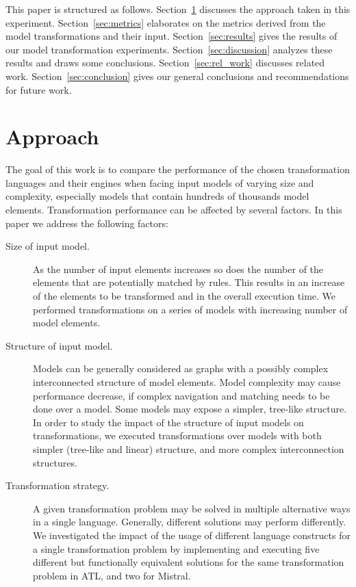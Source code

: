 \documentclass[12pt]{elsarticle}
\begin{document}
This paper is structured as follows. Section~\ref{sec:approach} discusses the
approach taken in this experiment. Section~\ref{sec:metrics} elaborates on
the metrics derived from the model transformations and their input.
Section~\ref{sec:results} gives the results of our model transformation
experiments. Section~\ref{sec:discussion} analyzes these results and draws some conclusions.
Section~\ref{sec:rel_work} discusses related work. Section~\ref{sec:conclusion}
gives our general conclusions and recommendations for future work.

\section{Approach}\label{sec:approach}

The goal of this work is to compare the performance of the chosen transformation
languages and their engines when facing input models of varying size and complexity,
especially models that contain hundreds of thousands model elements.
Transformation performance can be affected by several factors. In this paper we
address the following factors:

\begin{description}
\item[Size of input model.] As the number of input elements increases so does
the number of the elements that are potentially matched by rules. This results
in an increase of the elements to be transformed and in the overall execution
time. We performed transformations on a series of models with increasing number
of model elements.
\item[Structure of input model.] Models can be generally considered as graphs with a possibly
complex interconnected structure of model elements. Model complexity may cause
performance decrease, if complex navigation and matching needs to be done over
a model. Some models may expose a simpler, tree-like structure. In order to
study the impact of the structure of input models on transformations, we
executed transformations over models with both simpler (tree-like and linear)
structure, and more complex interconnection structures.
\item [Transformation strategy.] A given transformation problem may be solved
in multiple alternative ways in a single language. Generally, different solutions may
perform differently. We investigated the impact of the usage of different language
constructs for a single transformation problem by implementing and executing
five different but functionally equivalent solutions for the same
transformation problem in ATL, and two for Mistral.
\end{description}
\end{document}
